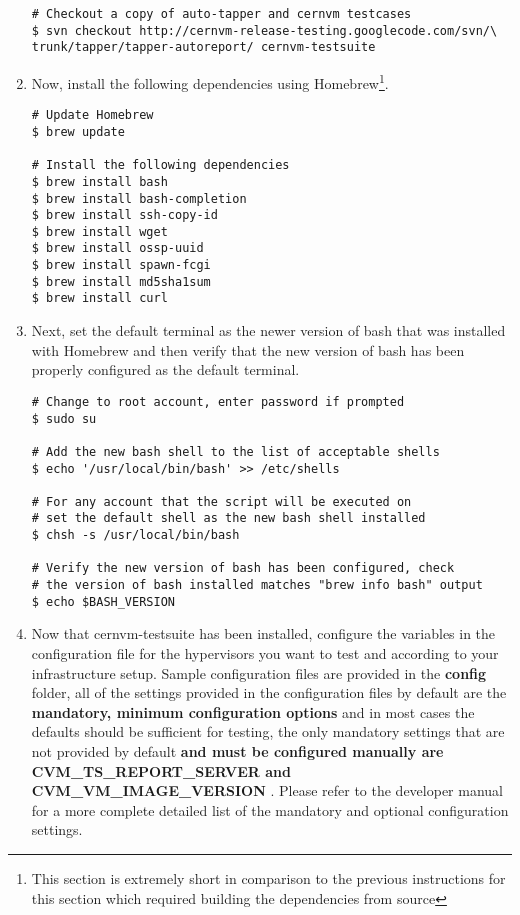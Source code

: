 \begin{enumerate}
\begin{lstlisting}
# Checkout a copy of auto-tapper and cernvm testcases
$ svn checkout http://cernvm-release-testing.googlecode.com/svn/\
trunk/tapper/tapper-autoreport/ cernvm-testsuite
\end{lstlisting}

\item        Now, install the following dependencies using Homebrew\footnote{This section is extremely short in comparison to the previous
                instructions for this section which required building the dependencies from source}.
                
\lstset{language=bash,caption=Install Dependencies}
\begin{lstlisting}
# Update Homebrew
$ brew update

# Install the following dependencies
$ brew install bash
$ brew install bash-completion
$ brew install ssh-copy-id
$ brew install wget
$ brew install ossp-uuid
$ brew install spawn-fcgi
$ brew install md5sha1sum
$ brew install curl
\end{lstlisting}

\item	Next, set the default terminal as the newer version of bash that was installed with Homebrew and then verify that
			the new version of bash has been properly configured as the default terminal.

\lstset{language=bash,caption=Configure Bash}
\begin{lstlisting}
# Change to root account, enter password if prompted
$ sudo su

# Add the new bash shell to the list of acceptable shells
$ echo '/usr/local/bin/bash' >> /etc/shells

# For any account that the script will be executed on 
# set the default shell as the new bash shell installed
$ chsh -s /usr/local/bin/bash

# Verify the new version of bash has been configured, check 
# the version of bash installed matches "brew info bash" output
$ echo $BASH_VERSION
\end{lstlisting}

\item	Now that cernvm-testsuite has been installed, configure the variables in the configuration file for the
			hypervisors you want to test and according to your \tapper infrastructure setup. Sample configuration files are provided
			in the {\bf config} folder, all of the settings provided in the configuration files by default are the {\bf mandatory, minimum 
			configuration options} and in most cases the	defaults should be sufficient for testing, the only mandatory settings that are
			not provided by default {\bf and must be configured manually are CVM\_TS\_REPORT\_SERVER and 
			CVM\_VM\_IMAGE\_VERSION }. Please refer to the developer manual for a more complete detailed list of the mandatory and 
			optional configuration settings.


\end{enumerate}
